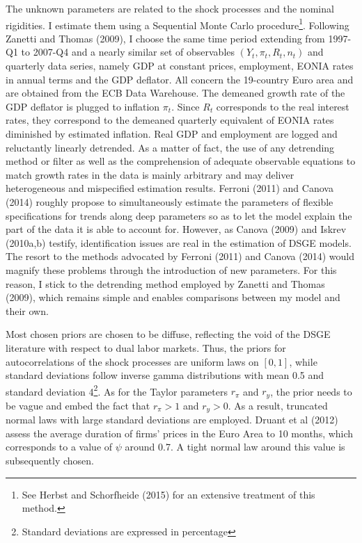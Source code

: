 \documentclass[a4paper]{article}
\begin{document}
The unknown parameters are related to the shock processes and the nominal rigidities. I estimate them using a Sequential Monte Carlo procedure\footnote{See Herbst and Schorfheide (2015) \cite{herbst2015bayesian} for an extensive treatment of this method.}. Following Zanetti and Thomas (2009), I choose the same time period extending from 1997-Q1 to 2007-Q4 and a nearly similar set of observables $\left( Y_t, \pi_t, R_t, n_t\right)$ and quarterly data series, namely GDP at constant prices, employment, EONIA rates in annual terms and the GDP deflator. All concern the 19-country Euro area and are obtained from the ECB Data Warehouse. The demeaned growth rate of the GDP deflator is plugged to inflation $\pi_t$. Since $R_t$ corresponds to the real interest rates, they correspond to the demeaned quarterly equivalent of EONIA rates diminished by estimated inflation. Real GDP and employment are logged and reluctantly linearly detrended. As a matter of fact, the use of any detrending method or filter as well as the comprehension of adequate observable equations to match growth rates in the data is mainly arbitrary and may deliver heterogeneous and mispecified estimation results. Ferroni (2011) \cite{ferroni2011trend} and Canova (2014) \cite{canova2014bridging} roughly propose to simultaneously estimate the parameters of flexible specifications for trends along deep parameters so as to let the model explain the part of the data it is able to account for. However, as Canova (2009) \cite{canova2009back} and Iskrev (2010a,b) \cite{iskrev2010local, iskrev2010evaluating} testify, identification issues are real in the estimation of DSGE models. The resort to the methods advocated by Ferroni (2011) and Canova (2014) would magnify these problems through the introduction of new parameters. For this reason, I stick to the detrending method employed by Zanetti and Thomas (2009), which remains simple and enables comparisons between my model and their own.

Most chosen priors are chosen to be diffuse, reflecting the void of the DSGE literature with respect to dual labor markets. Thus, the priors for autocorrelations of the shock processes are uniform laws on $[0,1]$, while standard deviations follow inverse gamma distributions with mean 0.5 and standard deviation 4\footnote{Standard deviations are expressed in percentage}. As for the Taylor parameters $r_\pi$ and $r_y$, the prior needs to be vague and embed the fact that $r_\pi > 1$ and $r_y > 0$. As a result, truncated normal laws with large standard deviations are employed. Druant et al (2012) \cite{DRUANT2012772} assess the average duration of firms' prices in the Euro Area to 10 months, which corresponds to a value of $\psi$ around 0.7. A tight normal law around this value is subsequently chosen.
\end{document}
